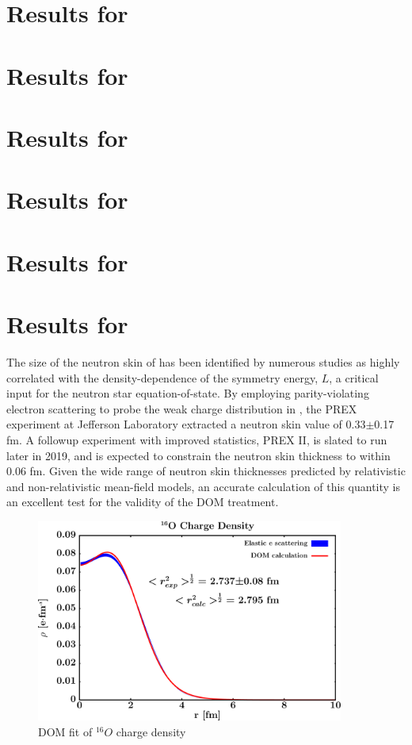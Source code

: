 \section{Results for \caEight}

\section{Results for \niEight}

\section{Results for \niFour}

\section{Results for \snTwelve}

\section{Results for \snFour}

\section{Results for \pbEight}
The size of the neutron skin of \pbEight has been identified by numerous studies as highly
correlated with the density-dependence of the symmetry energy, $L$, a critical input for the neutron
star equation-of-state. By employing parity-violating electron scattering to probe the
weak charge distribution in \pbEight, the PREX experiment at Jefferson Laboratory extracted a
\pbEight neutron skin value of 0.33$\pm$0.17 fm. A followup experiment with improved statistics, PREX II,
is slated to run later in 2019, and is expected to constrain the \pbEight neutron skin thickness to
within 0.06 fm. Given the wide range of \pbEight neutron skin thicknesses predicted by relativistic
and non-relativistic mean-field models, an accurate calculation of this quantity is an excellent
test for the validity of the DOM treatment.

\begin{figure}
\begin{center}
\includegraphics[width = 0.9\textwidth]{figures/o16_chargeDensity.png}
\caption{DOM fit of $^{16}O$ charge density}
\label{o16ChargeDensity}
\end{center}
\end{figure}

